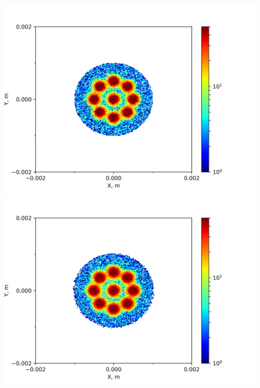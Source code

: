 \documentclass{article}
\begin{document}
\hspace*{\fill}
\includegraphics[scale=0.4]{Matplotlib_script/0000.png}
\hspace*{0.25in}
\includegraphics[scale=0.4]{Matplotlib_script/0001.png}
\hspace*{\fill}
\end{document}
